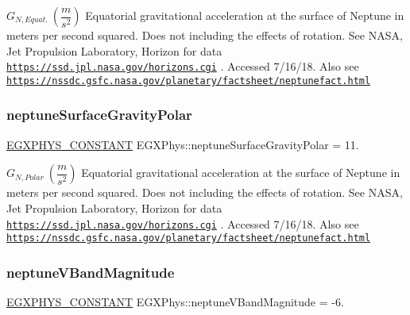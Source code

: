 $ G_{N,Equat.} \ (\dfrac{m}{s^2})$ Equatorial gravitational acceleration at the surface of Neptune in meters per second squared. Does not including the effects of rotation. See N\+A\+SA, Jet Propulsion Laboratory, Horizon for data \href{https://ssd.jpl.nasa.gov/horizons.cgi}{\tt https\+://ssd.\+jpl.\+nasa.\+gov/horizons.\+cgi} . Accessed 7/16/18. Also see \href{https://nssdc.gsfc.nasa.gov/planetary/factsheet/neptunefact.html}{\tt https\+://nssdc.\+gsfc.\+nasa.\+gov/planetary/factsheet/neptunefact.\+html} \mbox{\label{group___e_g_x_phys-_constants-_astrophysics-_solar_system-_neptune-_bulk_gaced020806337cc629db19c32b936eba5}} 
\subsubsection{\texorpdfstring{neptune\+Surface\+Gravity\+Polar}{neptuneSurfaceGravityPolar}}
{\footnotesize\ttfamily \mbox{\hyperlink{group___e_g_x_phys-_constants-_macros_ga76980d288494ce1714c9ac68a95ba702}{E\+G\+X\+P\+H\+Y\+S\+\_\+\+C\+O\+N\+S\+T\+A\+NT}} E\+G\+X\+Phys\+::neptune\+Surface\+Gravity\+Polar = 11.}

$ G_{N,Polar} \ (\dfrac{m}{s^2})$ Equatorial gravitational acceleration at the surface of Neptune in meters per second squared. Does not including the effects of rotation. See N\+A\+SA, Jet Propulsion Laboratory, Horizon for data \href{https://ssd.jpl.nasa.gov/horizons.cgi}{\tt https\+://ssd.\+jpl.\+nasa.\+gov/horizons.\+cgi} . Accessed 7/16/18. Also see \href{https://nssdc.gsfc.nasa.gov/planetary/factsheet/neptunefact.html}{\tt https\+://nssdc.\+gsfc.\+nasa.\+gov/planetary/factsheet/neptunefact.\+html} \mbox{\label{group___e_g_x_phys-_constants-_astrophysics-_solar_system-_neptune-_bulk_ga6d3cc54fffb243ec0b0a4dfef481b965}} 
\subsubsection{\texorpdfstring{neptune\+V\+Band\+Magnitude}{neptuneVBandMagnitude}}
{\footnotesize\ttfamily \mbox{\hyperlink{group___e_g_x_phys-_constants-_macros_ga76980d288494ce1714c9ac68a95ba702}{E\+G\+X\+P\+H\+Y\+S\+\_\+\+C\+O\+N\+S\+T\+A\+NT}} E\+G\+X\+Phys\+::neptune\+V\+Band\+Magnitude = -\/6.}

